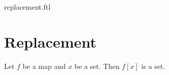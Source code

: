 \documentclass{naproche-library}
\begin{document}
\begin{smodule}{replacement.ftl}

  \section{Replacement}

  \begin{axiom}[forthel,title=Replacement Axiom,id=FOUNDATIONS_10_8142956584239104,printid]
    Let $f$ be a map and $x$ be a set.
    Then $f[x]$ is a set.
  \end{axiom}
\end{smodule}
\end{document}
